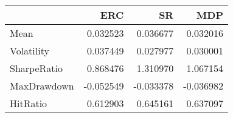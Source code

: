\begin{tabular}{lrrr}
\toprule
{} &       ERC &        SR &       MDP \\
\midrule
Mean        &  0.032523 &  0.036677 &  0.032016 \\
Volatility  &  0.037449 &  0.027977 &  0.030001 \\
SharpeRatio &  0.868476 &  1.310970 &  1.067154 \\
MaxDrawdown & -0.052549 & -0.033378 & -0.036982 \\
HitRatio    &  0.612903 &  0.645161 &  0.637097 \\
\bottomrule
\end{tabular}
